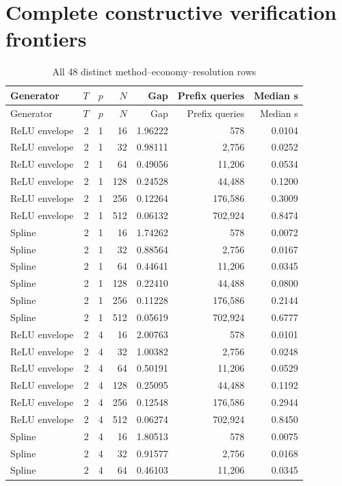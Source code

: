 \section{Complete constructive verification frontiers}
\begin{longtable}{lrrrrrr}
\caption{All 48 distinct method--economy--resolution rows}\label{tab:frontier45}\\
\toprule
Generator & $T$ & $p$ & $N$ & Gap & Prefix queries & Median s\\
\midrule\endfirsthead
\toprule
Generator & $T$ & $p$ & $N$ & Gap & Prefix queries & Median s\\
\midrule\endhead
ReLU envelope & 2 & 1 & 16 & 1.96222 & 578 & 0.0104 \\
ReLU envelope & 2 & 1 & 32 & 0.98111 & 2,756 & 0.0252 \\
ReLU envelope & 2 & 1 & 64 & 0.49056 & 11,206 & 0.0534 \\
ReLU envelope & 2 & 1 & 128 & 0.24528 & 44,488 & 0.1200 \\
ReLU envelope & 2 & 1 & 256 & 0.12264 & 176,586 & 0.3009 \\
ReLU envelope & 2 & 1 & 512 & 0.06132 & 702,924 & 0.8474 \\
Spline & 2 & 1 & 16 & 1.74262 & 578 & 0.0072 \\
Spline & 2 & 1 & 32 & 0.88564 & 2,756 & 0.0167 \\
Spline & 2 & 1 & 64 & 0.44641 & 11,206 & 0.0345 \\
Spline & 2 & 1 & 128 & 0.22410 & 44,488 & 0.0800 \\
Spline & 2 & 1 & 256 & 0.11228 & 176,586 & 0.2144 \\
Spline & 2 & 1 & 512 & 0.05619 & 702,924 & 0.6777 \\
ReLU envelope & 2 & 4 & 16 & 2.00763 & 578 & 0.0101 \\
ReLU envelope & 2 & 4 & 32 & 1.00382 & 2,756 & 0.0248 \\
ReLU envelope & 2 & 4 & 64 & 0.50191 & 11,206 & 0.0529 \\
ReLU envelope & 2 & 4 & 128 & 0.25095 & 44,488 & 0.1192 \\
ReLU envelope & 2 & 4 & 256 & 0.12548 & 176,586 & 0.2944 \\
ReLU envelope & 2 & 4 & 512 & 0.06274 & 702,924 & 0.8450 \\
Spline & 2 & 4 & 16 & 1.80513 & 578 & 0.0075 \\
Spline & 2 & 4 & 32 & 0.91577 & 2,756 & 0.0168 \\
Spline & 2 & 4 & 64 & 0.46103 & 11,206 & 0.0345 \\

\end{longtable}
